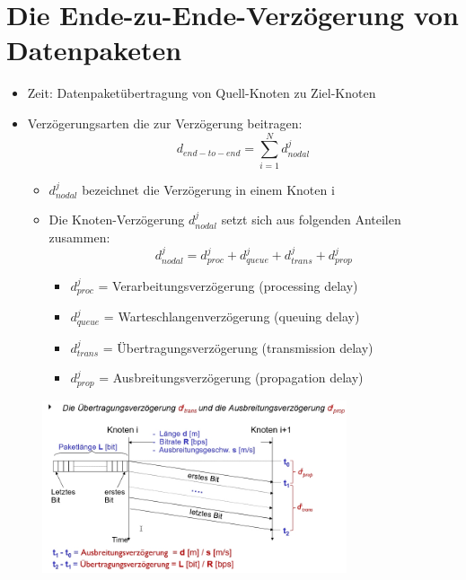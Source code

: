 \documentclass{scrreprt}
\begin{document}
\section{Die Ende-zu-Ende-Verzögerung von Datenpaketen}
\begin{itemize}
	\item Zeit: Datenpaketübertragung von Quell-Knoten zu Ziel-Knoten
	\item Verzögerungsarten die zur Verzögerung beitragen:
	      \\$$d_{end-to-end} = \sum_{i=1}^{N}{d^{j}_{nodal}}$$
	      \begin{itemize}
		      \item $d^{j}_{nodal}$ bezeichnet die Verzögerung in einem Knoten i
		      \item Die Knoten-Verzögerung $d^{j}_{nodal}$ setzt sich aus folgenden Anteilen zusammen:
		            \\$$d^{j}_{nodal} = d^{j}_{proc}+d^{j}_{queue}+d^{j}_{trans}+d^{j}_{prop}$$
		            \begin{itemize}
			            \item $d^{j}_{proc}$ = Verarbeitungsverzögerung (processing delay)
			            \item $d^{j}_{queue}$ = Warteschlangenverzögerung (queuing delay)
			            \item $d^{j}_{trans}$ = Übertragungsverzögerung (transmission delay)
			            \item $d^{j}_{prop}$ = Ausbreitungsverzögerung (propagation delay)
		            \end{itemize}
	      \end{itemize}
\end{itemize}
\begin{figure}[h]
	\includegraphics[width=0.80\textwidth]{"graphics/Uebertragung"}
	\centering
\end{figure}
\end{document}
